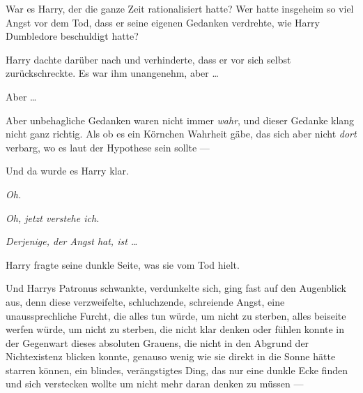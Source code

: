 War es Harry, der die ganze Zeit rationalisiert hatte? Wer hatte insgeheim so viel Angst vor dem Tod, dass er seine eigenen Gedanken verdrehte, wie Harry Dumbledore beschuldigt hatte?

Harry dachte darüber nach und verhinderte, dass er vor sich selbst zurückschreckte. Es war ihm unangenehm, aber …

Aber …

Aber unbehagliche Gedanken waren nicht immer \emph{wahr}, und dieser Gedanke klang nicht ganz richtig. Als ob es ein Körnchen Wahrheit gäbe, das sich aber nicht \emph{dort} verbarg, wo es laut der Hypothese sein sollte —

Und da wurde es Harry klar.

\emph{Oh.}

\emph{Oh, jetzt verstehe ich.}

\emph{Derjenige, der Angst hat, ist …}

Harry fragte seine dunkle Seite, was sie vom Tod hielt.

Und Harrys Patronus schwankte, verdunkelte sich, ging fast auf den Augenblick aus, denn diese verzweifelte, schluchzende, schreiende Angst, eine unaussprechliche Furcht, die alles tun würde, um nicht zu sterben, alles beiseite werfen würde, um nicht zu sterben, die nicht klar denken oder fühlen konnte in der Gegenwart dieses absoluten Grauens, die nicht in den Abgrund der Nichtexistenz blicken konnte, genauso wenig wie sie direkt in die Sonne hätte starren können, ein blindes, verängstigtes Ding, das nur eine dunkle Ecke finden und sich verstecken wollte um nicht mehr daran denken zu müssen —

